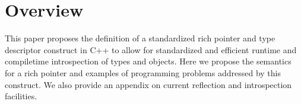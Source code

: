 \section{Overview}

This paper proposes the definition of a standardized rich pointer and type
descriptor construct in C++ to allow for standardized and efficient runtime and
compiletime introspection of types and objects. Here we propose the semantics
for a rich pointer and examples of programming problems addressed by this
construct. We also provide an appendix on current reflection and introspection facilities.